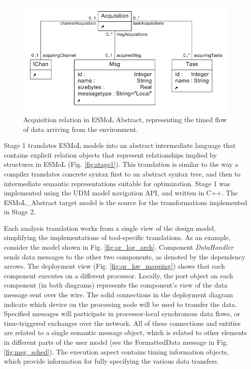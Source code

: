 \begin{figure}
\centering
\includegraphics[width=0.8\columnwidth]{figures/acquisition.png}
    \caption{Acquisition relation in ESMoL Abstract, representing the
timed flow of data arriving from the environment.}
    \label{fig:acq_meta}
\end{figure}

Stage 1 translates ESMoL models into an abstract intermediate language that
contains explicit relation objects that represent relationships implied by
structures in ESMoL (Fig. \ref{fig:stage1}). This translation is similar to the way a compiler translates concrete syntax first 
to an abstract syntax tree, and then to intermediate semantic representations suitable for optimization.  
Stage 1 was implemented using the UDM model navigation
API, and written in C++.  The ESMoL\_Abstract target model is the source for
the transformations implemented in Stage 2.

Each analysis translation works from a single view of the design model, 
simplifying the implementations of tool-specific translations.  
As an example, consider the model
shown in Fig. \ref{fig:qr_log_arch}.   Component
\emph{DataHandler} sends data messages to the other two components, as denoted by the
dependency arrows.  The deployment
view (Fig. \ref{fig:qr_hw_mapping}) shows that each component executes on a
different processor.  Locally, the port object on each component (in both
diagrams) represents the component's view of the data message sent over
the wire. The solid connections in the deployment diagram indicate which device
on the processing node will be used to transfer the data.  Specified messages
will participate in processor-local synchronous data flows, or time-triggered
exchanges over the network.  All of these connections and entities are related
to a single semantic message object, which is related to other elements in
different parts of the user model (see the FormattedData message in Fig.
\ref{fig:msg_sched}).  The execution aspect contains timing
information objects, which provide information for fully specifying
the various data transfers.

